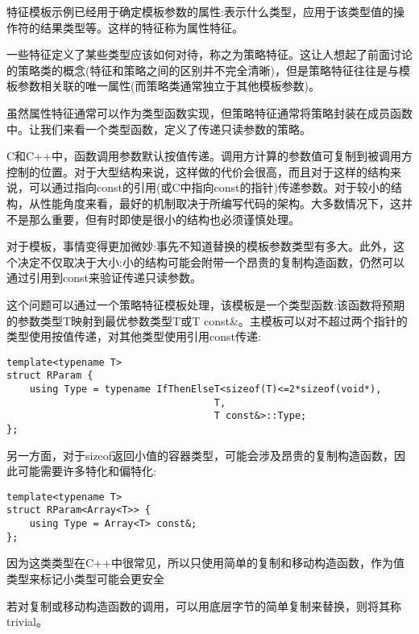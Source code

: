 
特征模板示例已经用于确定模板参数的属性:表示什么类型，应用于该类型值的操作符的结果类型等。这样的特征称为属性特征。

一些特征定义了某些类型应该如何对待，称之为策略特征。这让人想起了前面讨论的策略类的概念(特征和策略之间的区别并不完全清晰)，但是策略特征往往是与模板参数相关联的唯一属性(而策略类通常独立于其他模板参数)。

虽然属性特征通常可以作为类型函数实现，但策略特征通常将策略封装在成员函数中。让我们来看一个类型函数，定义了传递只读参数的策略。


C和C++中，函数调用参数默认按值传递。调用方计算的参数值可复制到被调用方控制的位置。对于大型结构来说，这样做的代价会很高，而且对于这样的结构来说，可以通过指向const的引用(或C中指向const的指针)传递参数。对于较小的结构，从性能角度来看，最好的机制取决于所编写代码的架构。大多数情况下，这并不是那么重要，但有时即使是很小的结构也必须谨慎处理。

对于模板，事情变得更加微妙:事先不知道替换的模板参数类型有多大。此外，这个决定不仅取决于大小:小的结构可能会附带一个昂贵的复制构造函数，仍然可以通过引用到const来验证传递只读参数。

这个问题可以通过一个策略特征模板处理，该模板是一个类型函数:该函数将预期的参数类型T映射到最优参数类型T或T const\&。主模板可以对不超过两个指针的类型使用按值传递，对其他类型使用引用const传递:

\begin{lstlisting}[style=styleCXX]
template<typename T>
struct RParam {
	using Type = typename IfThenElseT<sizeof(T)<=2*sizeof(void*),
									T,
									T const&>::Type;
};
\end{lstlisting}

另一方面，对于sizeof返回小值的容器类型，可能会涉及昂贵的复制构造函数，因此可能需要许多特化和偏特化:

\begin{lstlisting}[style=styleCXX]
template<typename T>
struct RParam<Array<T>> {
	using Type = Array<T> const&;
};
\end{lstlisting}

因为这类类型在C++中很常见，所以只使用简单的复制和移动构造函数，作为值类型来标记小类型可能会更安全

\begin{tcolorbox}[colback=webgreen!5!white,colframe=webgreen!75!black]
\hspace*{0.75cm}若对复制或移动构造函数的调用，可以用底层字节的简单复制来替换，则将其称trivial。
\end{tcolorbox}

